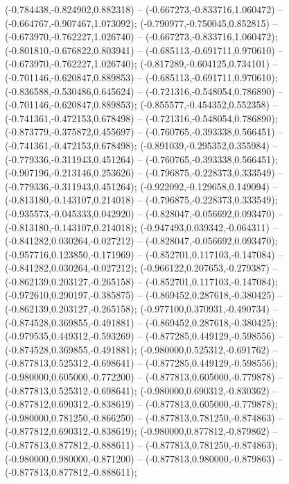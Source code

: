  (-0.784438,-0.824902,0.882318) -- (-0.667273,-0.833716,1.060472) -- (-0.664767,-0.907467,1.073092);
 (-0.790977,-0.750045,0.852815) -- (-0.673970,-0.762227,1.026740) -- (-0.667273,-0.833716,1.060472);
 (-0.801810,-0.676822,0.803941) -- (-0.685113,-0.691711,0.970610) -- (-0.673970,-0.762227,1.026740);
 (-0.817289,-0.604125,0.734101) -- (-0.701146,-0.620847,0.889853) -- (-0.685113,-0.691711,0.970610);
 (-0.836588,-0.530486,0.645624) -- (-0.721316,-0.548054,0.786890) -- (-0.701146,-0.620847,0.889853);
 (-0.855577,-0.454352,0.552358) -- (-0.741361,-0.472153,0.678498) -- (-0.721316,-0.548054,0.786890);
 (-0.873779,-0.375872,0.455697) -- (-0.760765,-0.393338,0.566451) -- (-0.741361,-0.472153,0.678498);
 (-0.891039,-0.295352,0.355984) -- (-0.779336,-0.311943,0.451264) -- (-0.760765,-0.393338,0.566451);
 (-0.907196,-0.213146,0.253626) -- (-0.796875,-0.228373,0.333549) -- (-0.779336,-0.311943,0.451264);
 (-0.922092,-0.129658,0.149094) -- (-0.813180,-0.143107,0.214018) -- (-0.796875,-0.228373,0.333549);
 (-0.935573,-0.045333,0.042920) -- (-0.828047,-0.056692,0.093470) -- (-0.813180,-0.143107,0.214018);
 (-0.947493,0.039342,-0.064311) -- (-0.841282,0.030264,-0.027212) -- (-0.828047,-0.056692,0.093470);
 (-0.957716,0.123850,-0.171969) -- (-0.852701,0.117103,-0.147084) -- (-0.841282,0.030264,-0.027212);
 (-0.966122,0.207653,-0.279387) -- (-0.862139,0.203127,-0.265158) -- (-0.852701,0.117103,-0.147084);
 (-0.972610,0.290197,-0.385875) -- (-0.869452,0.287618,-0.380425) -- (-0.862139,0.203127,-0.265158);
 (-0.977100,0.370931,-0.490734) -- (-0.874528,0.369855,-0.491881) -- (-0.869452,0.287618,-0.380425);
 (-0.979535,0.449312,-0.593269) -- (-0.877285,0.449129,-0.598556) -- (-0.874528,0.369855,-0.491881);
 (-0.980000,0.525312,-0.691762) -- (-0.877813,0.525312,-0.698641) -- (-0.877285,0.449129,-0.598556);
 (-0.980000,0.605000,-0.772200) -- (-0.877813,0.605000,-0.779878) -- (-0.877813,0.525312,-0.698641);
 (-0.980000,0.690312,-0.830362) -- (-0.877812,0.690312,-0.838619) -- (-0.877813,0.605000,-0.779878);
 (-0.980000,0.781250,-0.866250) -- (-0.877813,0.781250,-0.874863) -- (-0.877812,0.690312,-0.838619);
 (-0.980000,0.877812,-0.879862) -- (-0.877813,0.877812,-0.888611) -- (-0.877813,0.781250,-0.874863);
 (-0.980000,0.980000,-0.871200) -- (-0.877813,0.980000,-0.879863) -- (-0.877813,0.877812,-0.888611);
